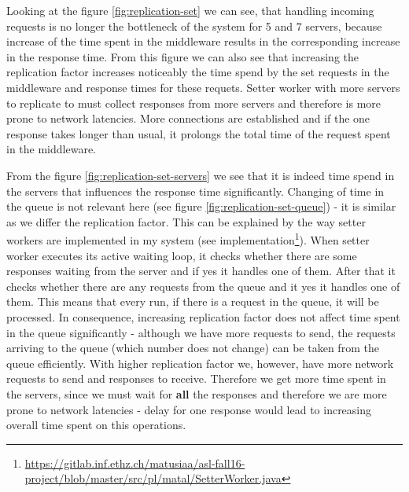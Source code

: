 \documentclass[11pt]{article}
\begin{document}
Looking at the figure \ref{fig:replication-set} we can see, that handling incoming requests is no longer the bottleneck of the system for 5 and 7 servers, because increase of the time spent in the middleware results in the corresponding increase in the response time. From this figure we can also see that increasing the replication factor increases noticeably the time spend by the set requests in the middleware and response times for these requets. Setter worker with more servers to replicate to must collect responses from more servers and therefore is more prone to network latencies. More connections are established and if the one response takes longer than usual, it prolongs the total time of the request spent in the middleware.

From the figure \ref{fig:replication-set-servers} we see that it is indeed time spend in the servers that influences the response time significantly. Changing of time in the queue is not relevant here (see figure \ref{fig:replication-set-queue}) - it is similar as we differ the replication factor. 
This can be explained by the way setter workers are implemented in my system (see implementation\footnote{\url{https://gitlab.inf.ethz.ch/matusiaa/asl-fall16-project/blob/master/src/pl/matal/SetterWorker.java}}). When setter worker executes its active waiting loop, it checks whether there are some responses waiting from the server and if yes it handles one of them. After that it checks whether there are any requests from the queue and it yes it handles one of them. This means that every run, if there is a request in the queue, it will be processed. In consequence, increasing replication factor does not affect time spent in the queue significantly - although we have more requests to send, the requests arriving to the queue (which number does not change) can be taken from the queue efficiently.
With higher replication factor 
we, however, have more network requests to send and responses to receive. Therefore we get more time spent in the servers, since we must wait for {\bf all} the responses and therefore we are more prone to network latencies - delay for one response would lead to increasing overall time spent on this operations. 
\end{document}
